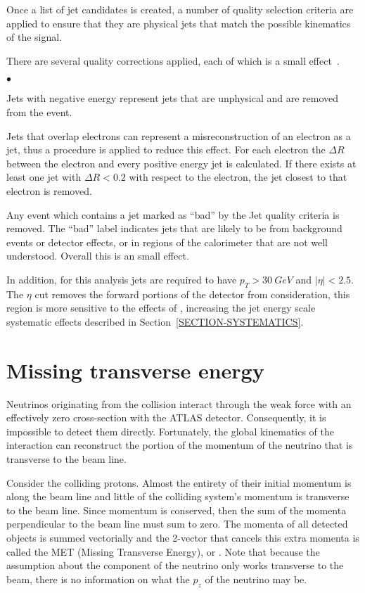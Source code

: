Once a list of jet candidates is created, a number of quality selection criteria are applied to ensure that they are physical jets that match the possible kinematics of the signal.

There are several quality corrections applied, each of which is a small effect~\cite{JETCLEAN}. 
\begin{list}{$\bullet$}{}

\item Jets with negative energy represent jets that are unphysical and are removed from the event. 
\item Jets that overlap electrons can represent a misreconstruction of an electron as a jet, thus a procedure is applied to reduce this effect. For each electron the $\Delta R$ between the electron and every positive energy jet is calculated. If there exists at least one jet with $\Delta R <0.2$ with respect to the electron, the jet closest to that electron is removed. 
\item Any event which contains a jet marked as ``bad'' by the Jet quality criteria is removed. The ``bad'' label indicates jets that are likely to be from background events or detector effects, or in regions of the calorimeter that are not well understood. Overall this is an small effect. 
\end{list}
In addition, for this analysis jets are required to have $p_{T} > 30\ GeV$ and $|\eta| < 2.5$. The $\eta$ cut removes the forward portions of the detector from consideration, this region is more sensitive to the effects of \pileup, increasing the jet energy scale systematic effects described in Section~\ref{SECTION-SYSTEMATICS}. 

\section{Missing transverse energy}
\label{SECTION-MET}
Neutrinos originating from the collision interact through the weak force with an effectively zero cross-section with the ATLAS detector. Consequently, it is impossible to detect them directly. Fortunately, the global kinematics of the interaction can reconstruct the portion of the momentum of the neutrino that is transverse to the beam line. 

Consider the colliding protons. Almost the entirety of their initial momentum is along the beam line and little of the colliding system's momentum is transverse to the beam line. Since momentum is conserved, then the sum of the momenta perpendicular to the beam line must sum to zero. The momenta of all detected objects is summed vectorially and the 2-vector that cancels this extra momenta is called the MET (Missing Transverse Energy), or \MET. Note that because the assumption about the component of the neutrino only works transverse to the beam, there is no information on what the $p_{z}$ of the neutrino may be.

